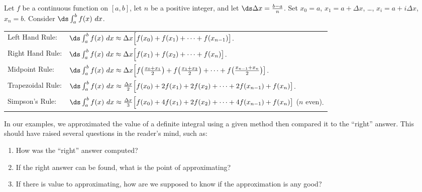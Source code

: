 {
\begin{keyidea}\label{idea:numerical}
Let $f$ be a continuous function on $[a,b]$, let $n$ be a positive integer, and let $\ds\Delta x = \frac{b-a}{n}$.
Set $x_0=a$, $x_1=a+\Delta x$, \dots, $x_i = a+i\Delta x$, $x_n=b$.
Consider $\ds\int_a^b f(x)\ dx$.\\
\begin{tabular}{ll}
Left Hand Rule: &
$\ds\int_a^b f(x)\ dx \approx \Delta x\Big[f(x_0) + f(x_1) + \dotsb + f(x_{n-1})\big]$.\\
Right Hand Rule: &
$\ds\int_a^b f(x)\ dx \approx \Delta x\Big[f(x_1) + f(x_2) + \dotsb + f(x_n)\big]$.\\
Midpoint Rule: &
$\ds\int_a^b f(x)\ dx \approx \Delta x\Big[f\big(\frac{x_0+x_1}2\big) + f\big(\frac{x_1+x_2}2\big) + \dotsb + f\big(\frac{x_{n-1}+x_n}2\big)\big]$.\\
Trapezoidal Rule: &
$\ds\int_a^b f(x)\ dx \approx \frac{\Delta x}2\Big[f(x_0) + 2f(x_1) + 2f(x_2) +\dotsb + 2f(x_{n-1})+ f(x_n)\big]$.\\
Simpson's Rule: &
$\ds\int_a^b f(x)\ dx \approx \frac{\Delta x}3\Big[f(x_0) + 4f(x_1) + 2f(x_2) +\dotsb + 4f(x_{n-1})+ f(x_n)\big]$ {\small ($n$ even)}.
\end{tabular}
\end{keyidea}
}

In our examples, we approximated the value of a definite integral using a given method then compared it to the ``right'' answer. This should have raised several questions in the reader's mind, such as:
\begin{enumerate}
	\item	How was the ``right'' answer computed?
	\item	If the right answer can be found, what is the point of approximating?
	\item	If there is value to approximating, how are we supposed to know if the approximation is any good?
\end{enumerate}

